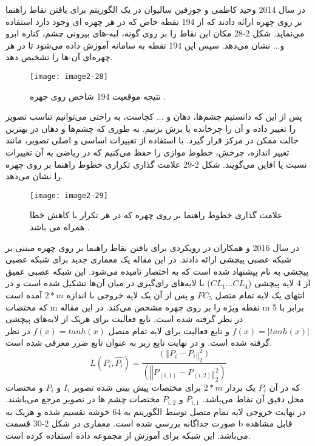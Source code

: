 \noindent 
در سال 2014 وحيد كاظمى و جوزفين ساليوان در \cite{6909637} یک الگوریتم برای یافتن نقاط راهنما بر روی چهره ارائه دادند كه از 194 نقطه خاص كه در هر چهره اى وجود دارد استفاده مي‌نماید. شکل 2-28 مکان این نقاط را بر روی گونه، لبه-هاى بیرونی چشم، كناره ابرو و... نشان می‌دهد. سپس اين 194 نقطه به سامانه آموزش داده می‌شود تا در هر چهره‌اى آن-ها را تشخيص دهد. 
\begin{figure}[h]
\centering
  \texttt{[image: image2-28]}
  \caption{نتیجه موقعیت 194 شاخص روی چهره \cite{ref1}.}
  \label{image2-28}
\end{figure}
\noindent
پس از این که دانستیم چشم‌ها، دهان و ... کجاست، به راحتی می‌توانیم تناسب تصویر را تغییر داده و آن را چرخانده یا برش بزنیم. به طوری که چشم‌ها و دهان در بهترین حالت ممکن در مرکز قرار گیرد. با استفاده از تغییرات اساسی و اصلی تصویر، مانند تغییر اندازه، چرخش، خطوط موازی را حفظ می‌کنیم که در ریاضی به آن تغییرات نسبت یا افاین می‌گویند. شکل 2-29 علامت گذاری تکراری خطوط راهنما بر روی چهره را نشان می‌دهد. 
\begin{figure}[h]
\centering
  \texttt{[image: image2-29]}
  \caption{علامت گذاری خطوط راهنما بر روی چهره که در هر تکرار با کاهش خطا همراه می باشد \cite{ref1}.}
  \label{image2-29}
\end{figure}

\noindent
در سال 2016  و همکاران در \cite{wu2016facial} رویکردی برای یافتن نقاط راهنما بر روی چهره مبتنی بر شبکه عصبی پیچشی ارائه دادند. در این مقاله یک معماری جدید برای شبکه عصبی پیچشی به نام
پیشنهاد شده است که به اختصار  نامیده می‌شود. این شبکه عصبی عمیق از 4 لایه پیچشی ($CL_1 \dots CL_4$) با لایه‌های رای‌گیری در میان آن‌ها تشکیل شده است و در انتهای یک لایه تمام متصل  $FC_5$ و پس از آن یک لایه خروجی با اندازه $2*m$ آمده است که مختصات m نقطه ویژه را بر روی چهره مشخص می‌کند. در این مقاله m برابر با 5 در نظر گرفته شده است. تابع فعالیت برای هریک از لایه‌های پیچشی $f(x)=|tanh⁡(x)|$ و تابع فعالیت برای لایه تمام متصل $f(x)=tanh⁡(x)$ در نظر گرفته شده است. و در نهایت تابع زیر به عنوان تابع ضرر معرفی شده است.
\begin{equation}\label{eq2-12}
L(P_i,\hat{P_i})=\frac{(‖P_i-P ̂_i ‖_2^2)}{(‖P ̂_(i,1)-P ̂_(i,2) ‖_2^2 )}	
\end{equation}
\noindent
که در آن $P_i$ یک بردار $2*m$ برای مختصات پیش بینی شده تصویر $I_i$ و $P_i$ و مختصات محل دقیق آن نقاط می‌باشد. $P_{i,1}$ و $P_{i,2}$ مختصات چشم ها در تصویر مرجع می‌باشند. در نهایت خروجی لایه تمام متصل توسط الگوریتم  به 64 خوشه تقسیم شده و هریک به صورت جداگانه بررسی شده است. معماری  در شکل 2-30 قسمت b قابل مشاهده می‌باشد. این شبکه برای آموزش از مجموعه داده  استفاده کرده است.

